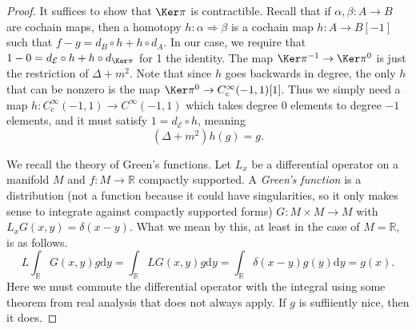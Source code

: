 \begin{proof}
It suffices to show that $\Ker \pi $ is contractible. Recall that if $\alpha ,\beta : A \to B$ are cochain maps, then a homotopy $h: \alpha  \Rightarrow \beta $ is a cochain map $h : A \to B[-1]$ such that $f-g=d_B\circ h + h\circ d_A$. In our case, we require that $1-0=d_\mathcal{E} \circ h + h \circ d_{\Ker \pi } $ for 1 the identity. The map $\Ker \pi ^{-1} \to \Ker \pi ^0$ is just the restriction of $\Delta+m^2$. Note that since $h$ goes backwards in degree, the only $h$ that can be nonzero is the map $\Ker \pi ^0 \to C^\infty _c(-1,1)[1]$. Thus we simply need a map $h : C^\infty _c(-1,1) \to C^\infty (-1,1)$ which takes degree 0 elements to degree $-1$ elements, and it must satisfy $1 = d_{\mathcal{E} } \circ h$, meaning
\[
	(\Delta +m^2)h(g)=g
.\]

We recall the theory of Green's functions. Let $L_x$ be a differential operator on a manifold $M$ and $f : M \to \mathbb{R} $ compactly supported. A \emph{Green's function} is a distribution (not a function because it could have singularities, so it only makes sense to integrate against compactly supported forms) $G : M\times M \to M$ with $L_xG(x,y)=\delta (x-y)$. What we mean by this, at least in the case of $M=\mathbb{R} $, is as follows.
\[
	L\int_{\mathbb{R} } G(x,y)g\mathrm{d} y = \int_{\mathbb{R} } LG(x,y)g\mathrm{d} y = \int_{\mathbb{R} } \delta (x-y)g(y)\mathrm{d} y=g(x)
.\]
Here we must commute the differential operator with the integral using some theorem from real analysis that does not always apply. If $g$ is suffiiently nice, then it does.


\end{proof}
